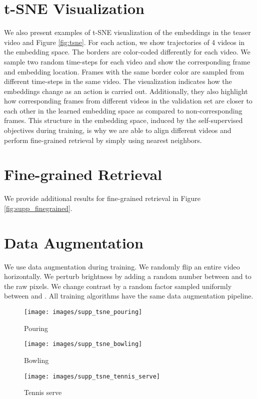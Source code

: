 \documentclass[10pt,twocolumn,letterpaper]{article}
\begin{document}
\section{t-SNE Visualization}
We also present examples of t-SNE visualization of the embeddings in the teaser video and Figure \ref{fig:tsne}. For each action, we show trajectories of 4 videos in the embedding space. The borders are color-coded differently for each video. We sample two random time-steps for each video and show the corresponding frame and embedding location. Frames with the same border color are sampled from different time-steps in the same video. The visualization indicates how the embeddings change as an action is carried out. Additionally, they also highlight how corresponding frames from different videos in the validation set are closer to each other in the learned embedding space as compared to non-corresponding frames. This structure in the embedding space, induced by the self-supervised objectives during training, is why we are able to align different videos and perform fine-grained retrieval by simply using nearest neighbors.

\section{Fine-grained Retrieval}
We provide additional results for fine-grained retrieval in Figure \ref{fig:supp_finegrained}.

\section{Data Augmentation}
We use data augmentation during training. We randomly flip an entire video horizontally. We perturb brightness by adding a random number between  and  to the raw pixels. We change contrast by a random factor sampled uniformly between  and . All training algorithms have the same data augmentation pipeline.


\begin{figure*}
    \centering
    \begin{subfigure}[b]{\textwidth}
        \texttt{[image: images/supp\_tsne\_pouring]}
         \caption{Pouring}
    \end{subfigure}
    \begin{subfigure}[b]{\textwidth}
        \texttt{[image: images/supp\_tsne\_bowling]}
         \caption{Bowling}

    \end{subfigure}

    \begin{subfigure}[b]{\textwidth}
        \texttt{[image: images/supp\_tsne\_tennis\_serve]}
          \caption{Tennis serve}
    \end{subfigure}
       \caption{\textbf{t-SNE Visualization of Embeddings.}}\label{fig:tsne}
\end{figure*}
\end{document}

